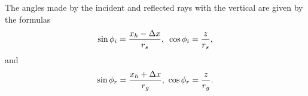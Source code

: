 The angles made by the incident and reflected rays with the vertical are given by the formulas
\begin{equation}\sin  \phi _{\text{\textit{$i$}}}=\frac{\text{\textit{$x_h$}}-\Delta \text{\textit{$x$}}\text{\textit{$ $}}}{\text{\textit{$r$}}_{\text{\textit{$s$}}}},\text{
  }\cos  \phi _{\text{\textit{$i$}}}=\frac{\text{\textit{$z$}}}{\text{\textit{$r$}}_{\text{\textit{$s$}}}},\end{equation}
and
\begin{equation}\sin  \phi _{\text{\textit{$r$}}}=\frac{\text{\textit{$x_h$}}+\Delta \text{\textit{$x$}}\text{\textit{$ $}}}{\text{\textit{$r$}}_{\text{\textit{$g$}}}},\ \cos
 \phi _{\text{\textit{$r$}}}=\frac{\text{\textit{$z $}}}{\text{\textit{$r$}}_{\text{\textit{$g$}}}}.\end{equation}

